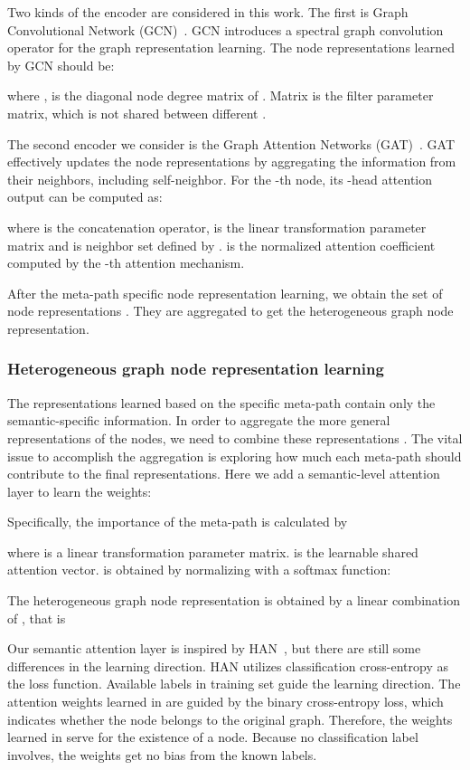 \documentclass[conference]{IEEEtran}
\begin{document}
	Two kinds of the encoder are considered in this work. The first is Graph Convolutional Network (GCN)~\cite{KW17}. 
	GCN introduces a spectral graph convolution operator for the graph representation learning. The node representations learned by GCN should be:

where ,  is the diagonal node degree matrix of . Matrix  is the filter parameter matrix, which is not shared between different . 
	
	The second encoder we consider is the Graph Attention Networks (GAT)~\cite{VCCRLB18}. GAT effectively updates the node representations by aggregating the information from their neighbors, including self-neighbor. For the -th node, its -head attention output can be computed as:
	

where  is the concatenation operator,  is the 
	linear transformation parameter matrix and  is neighbor set defined by .  is the normalized attention coefficient computed by the -th attention mechanism.


After the meta-path specific node representation learning, we obtain the set of node representations . They are aggregated to get the heterogeneous graph node representation. 


	\subsubsection{Heterogeneous graph node representation learning}
The representations learned based on the specific meta-path contain only the semantic-specific information.  In order to aggregate the more general representations of the nodes, we need to combine these representations .
	The vital issue to accomplish the aggregation is exploring how much each meta-path should contribute to the final representations. Here we add a semantic-level attention layer  to learn the weights:

Specifically, the importance of the meta-path  is calculated by

where  is a linear transformation parameter matrix.  is the learnable shared attention vector.  is obtained by normalizing  with a softmax function:

The heterogeneous graph node representation  is obtained by a linear combination of , that is 



Our semantic attention layer is inspired by HAN~\cite{WJSWCYY19}, but there are still some differences in the learning direction. HAN utilizes classification cross-entropy as the loss function. Available labels in training set guide the learning direction. The attention weights learned in {\our} are guided by the binary cross-entropy loss, which indicates whether the node belongs to the original graph. Therefore, the weights learned in {\our} serve for the existence of a node. Because no classification label involves, the weights get no bias from the known labels.
	
\end{document}
